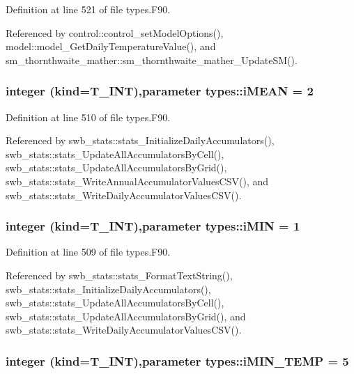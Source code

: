 Definition at line 521 of file types.F90.



Referenced by control::control\_\-setModelOptions(), model::model\_\-GetDailyTemperatureValue(), and sm\_\-thornthwaite\_\-mather::sm\_\-thornthwaite\_\-mather\_\-UpdateSM().

\hypertarget{namespacetypes_a65fde77ac5f489a0498cfd5cc6578bdf}{
\subsubsection[{iMEAN}]{\setlength{\rightskip}{0pt plus 5cm}integer (kind={\bf T\_\-INT}),parameter {\bf types::iMEAN} = 2}}
\label{namespacetypes_a65fde77ac5f489a0498cfd5cc6578bdf}


Definition at line 510 of file types.F90.



Referenced by swb\_\-stats::stats\_\-InitializeDailyAccumulators(), swb\_\-stats::stats\_\-UpdateAllAccumulatorsByCell(), swb\_\-stats::stats\_\-UpdateAllAccumulatorsByGrid(), swb\_\-stats::stats\_\-WriteAnnualAccumulatorValuesCSV(), and swb\_\-stats::stats\_\-WriteDailyAccumulatorValuesCSV().

\hypertarget{namespacetypes_a996356f311868440012a452bc3d0a323}{
\subsubsection[{iMIN}]{\setlength{\rightskip}{0pt plus 5cm}integer (kind={\bf T\_\-INT}),parameter {\bf types::iMIN} = 1}}
\label{namespacetypes_a996356f311868440012a452bc3d0a323}


Definition at line 509 of file types.F90.



Referenced by swb\_\-stats::stats\_\-FormatTextString(), swb\_\-stats::stats\_\-InitializeDailyAccumulators(), swb\_\-stats::stats\_\-UpdateAllAccumulatorsByCell(), swb\_\-stats::stats\_\-UpdateAllAccumulatorsByGrid(), and swb\_\-stats::stats\_\-WriteDailyAccumulatorValuesCSV().

\hypertarget{namespacetypes_a58eba3f16f91d9339380db844925820f}{
\subsubsection[{iMIN\_\-TEMP}]{\setlength{\rightskip}{0pt plus 5cm}integer (kind={\bf T\_\-INT}),parameter {\bf types::iMIN\_\-TEMP} = 5}}
\label{namespacetypes_a58eba3f16f91d9339380db844925820f}



